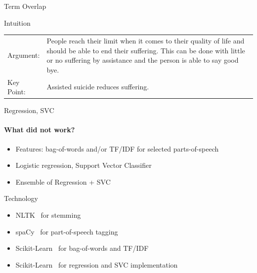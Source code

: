 \documentclass[english,handout]{mlutalk}
\newcommand{\TFIDF}{\mbox{TF/IDF}\xspace}
\begin{document}
\begin{frame}[allowframebreaks]{Term Overlap}
\begin{block}{Intuition}
    \begin{example}
      \smaller
      \begin{tabular}{lp{}}
        Argument: & People reach their limit when it comes to their quality of life and should be able to end their {\color{blue} suffering}. This can be done with little or no {\color{blue} suffering} by {\color{orange} assistance} and the person is able to say good bye. \\
        Key Point: & {\color{orange} Assisted} suicide reduces {\color{blue} suffering}.
      \end{tabular}
    \end{example}
  \end{block}

\end{frame}

\begin{frame}{Regression, SVC}
  
  \framesubtitle{What did not work?}
  
  \begin{itemize}
    \item Features: bag-of-words and/or \TFIDF for selected parts-of-speech
    \item Logistic regression, Support Vector Classifier
    \item Ensemble of Regression + SVC
  \end{itemize}
  
  \begin{block}{Technology}
      \begin{itemize}
        \item NLTK~\cite{Bird2006} for stemming
        \item spaCy~\cite{HonnibalMVLB2020} for part-of-speech tagging
        \item Scikit-Learn~\cite{PedregosaVGMTGBPWDVPCBPD2011} for bag-of-words and \TFIDF
        \item Scikit-Learn~\cite{PedregosaVGMTGBPWDVPCBPD2011} for regression and SVC implementation
      \end{itemize}
  \end{block}

\end{frame}
\end{document}
